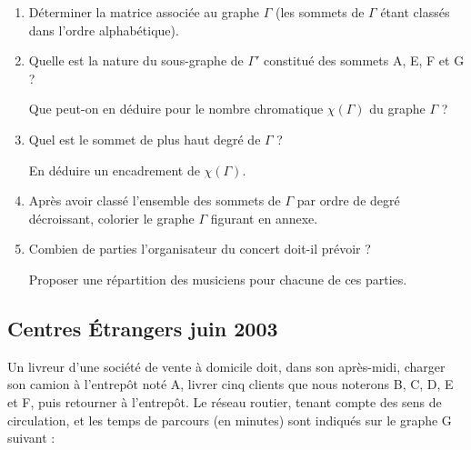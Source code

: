 \medskip
\begin{enumerate} 
\item Déterminer la matrice associée au graphe $\Gamma$ (les sommets de $\Gamma$ étant classés dans l'ordre alphabétique).
\item Quelle est la nature du sous-graphe de $\Gamma '$ constitué des sommets A, E, F et G ?

Que peut-on en déduire pour le nombre chromatique $\chi(\Gamma)$ du graphe $\Gamma$ ?
\item Quel est le sommet de plus haut degré de $\Gamma$ ?

En déduire un encadrement de $\chi(\Gamma)$.
\item Après avoir classé l'ensemble des sommets de $\Gamma$ par ordre de degré décroissant, colorier le graphe $\Gamma$ figurant en annexe.
\item Combien de parties l'organisateur du concert doit-il  prévoir ?

Proposer une répartition des musiciens pour chacune de ces parties.
\end{enumerate}

\medskip

\begin{tkzexample}
\end{tkzexample}


\vfill\newpage
\subsection{Centres Étrangers juin 2003 }\label{cej03} 

\bigskip
Un livreur d'une société de vente à domicile doit, dans son après-midi, charger son camion à l'entrepôt noté A, livrer cinq clients que nous noterons B, C, D, E et F, puis retourner à l'entrepôt. Le réseau routier, tenant compte des sens de circulation, et les temps de parcours (en minutes) sont indiqués sur le graphe G suivant :

